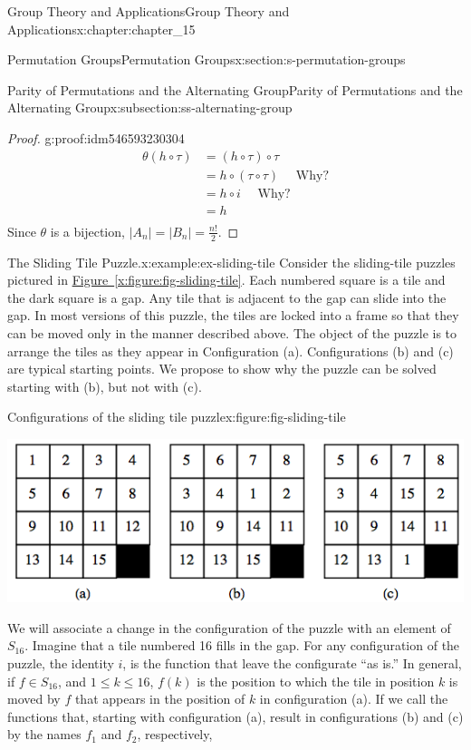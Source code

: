\documentclass[oneside,10pt,]{book}
\newcommand{\xreffont}{\relax}
\numberwithin{equation}{section}
\begin{document}
\begin{chapterptx}{Group Theory and Applications}{}{Group Theory and Applications}{}{}{x:chapter:chapter_15}
\begin{sectionptx}{Permutation Groups}{}{Permutation Groups}{}{}{x:section:s-permutation-groups}
\begin{subsectionptx}{Parity of Permutations and the Alternating Group}{}{Parity of Permutations and the Alternating Group}{}{}{x:subsection:ss-alternating-group}
\begin{proof}{}{g:proof:idm546593230304}
\begin{equation*}
\begin{split}
\theta(h\circ \tau ) & = (h\circ \tau )\circ \tau\\
& = h\circ (\tau \circ \tau )\quad \textrm{   Why?}\\
& = h\circ i\quad \textrm{    Why?}\\
& = h\\
\end{split}
\end{equation*}
Since \(\theta\) is a bijection,   \(\lvert A_n \rvert =\lvert B_n\rvert =\frac{n!}{2}\).%
\end{proof}
\begin{example}{The Sliding Tile Puzzle.}{x:example:ex-sliding-tile}%
Consider the sliding-tile puzzles pictured in \hyperref[x:figure:fig-sliding-tile]{Figure~{\xreffont\ref{x:figure:fig-sliding-tile}}}. Each numbered square is a tile and the dark square is a gap. Any tile that is adjacent to the gap can slide into the gap. In most versions of this puzzle, the tiles are locked into a frame so that they can be moved only in the manner described above. The object of the puzzle is to arrange the tiles as they appear in Configuration (a).  Configurations (b) and (c) are typical starting points. We propose to show why the puzzle can be solved starting with (b), but not with (c).%
\begin{figureptx}{Configurations of the sliding tile puzzle}{x:figure:fig-sliding-tile}{}%
\begin{image}{0.15}{0.7}{0.15}%
\includegraphics[width=\linewidth]{images/fig-sliding-tile.png}
\end{image}%
\tcblower
\end{figureptx}%
We will associate a change in the configuration of the puzzle with an element of \(S_{16}\). Imagine that a tile numbered 16 fills in the gap. For any configuration of the puzzle, the identity \(i\), is the function that leave the configurate ``as is.''   In general,  if \(f \in S_{16}\), and \(1 \leq  k \leq  16\), \(f(k)\) is the position to which  the tile in position \(k\) is moved by \(f\) that appears in the position of \(k\) in configuration (a). If we call the functions that, starting with configuration (a), result in configurations (b) and (c) by the names \(f_1\) and \(f_2\), respectively,%

\end{example}
\end{subsectionptx}
\end{sectionptx}
\end{chapterptx}
\end{document}
